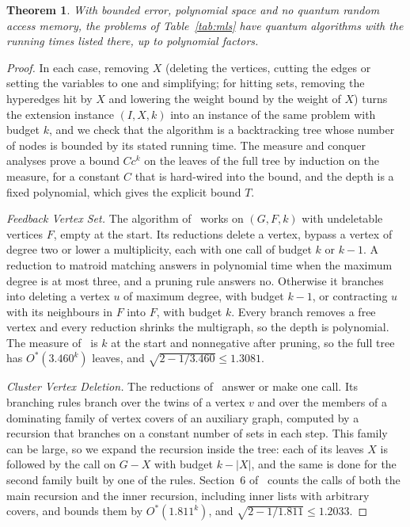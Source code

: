 \documentclass[11pt]{article}
\newtheorem{theorem}{Theorem}[section]
\theoremstyle{remark}
\begin{document}
\begin{theorem}\label{thm:mlscor}
With bounded error, polynomial space and no quantum random access memory, the problems of Table~\ref{tab:mls} have quantum algorithms with the running times listed there, up to polynomial factors.
\end{theorem}

\begin{proof}
In each case, removing $X$ (deleting the vertices, cutting the edges or setting the variables to one and simplifying; for hitting sets, removing the hyperedges hit by $X$ and lowering the weight bound by the weight of $X$) turns the extension instance $(I, X, k)$ into an instance of the same problem with budget $k$, and we check that the algorithm is a backtracking tree whose number of nodes is bounded by its stated running time. The measure and conquer analyses prove a bound $C c^k$ on the leaves of the full tree by induction on the measure, for a constant $C$ that is hard-wired into the bound, and the depth is a fixed polynomial, which gives the explicit bound $T$.

\emph{Feedback Vertex Set.} The algorithm of~\cite{IK19} works on $(G, F, k)$ with undeletable vertices $F$, empty at the start. Its reductions delete a vertex, bypass a vertex of degree two or lower a multiplicity, each with one call of budget $k$ or $k-1$. A reduction to matroid matching answers in polynomial time when the maximum degree is at most three, and a pruning rule answers no. Otherwise it branches into deleting a vertex $u$ of maximum degree, with budget $k-1$, or contracting $u$ with its neighbours in $F$ into $F$, with budget $k$. Every branch removes a free vertex and every reduction shrinks the multigraph, so the depth is polynomial. The measure of~\cite{IK19} is $k$ at the start and nonnegative after pruning, so the full tree has $O^*(3.460^k)$ leaves, and $\sqrt{2 - 1/3.460} \le 1.3081$.

\emph{Cluster Vertex Deletion.} The reductions of~\cite{Tsu19} answer or make one call. Its branching rules branch over the twins of a vertex $v$ and over the members of a dominating family of vertex covers of an auxiliary graph, computed by a recursion that branches on a constant number of sets in each step. This family can be large, so we expand the recursion inside the tree: each of its leaves $X$ is followed by the call on $G - X$ with budget $k - |X|$, and the same is done for the second family built by one of the rules. Section~6 of~\cite{Tsu19} counts the calls of both the main recursion and the inner recursion, including inner lists with arbitrary covers, and bounds them by $O^*(1.811^k)$, and $\sqrt{2-1/1.811} \le 1.2033$.


\end{proof}
\end{document}
